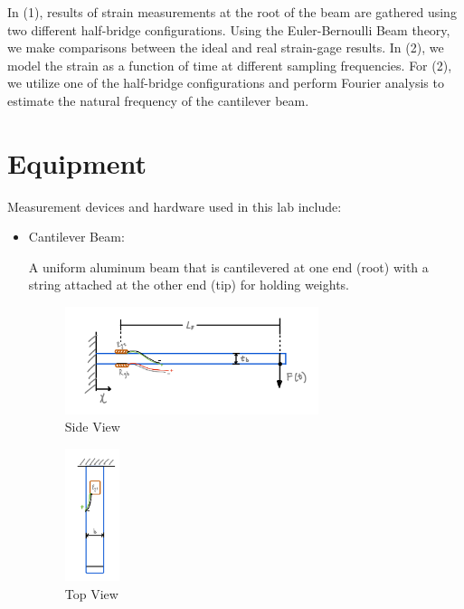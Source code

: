 \documentclass{article}
\begin{document}
In (1), results of strain measurements at the root of the beam are gathered using two different half-bridge configurations. Using the Euler-Bernoulli Beam theory, we make comparisons between the ideal and real strain-gage results. In (2), we model the strain as a function of time at different sampling frequencies. For (2), we utilize one of the half-bridge configurations and perform Fourier analysis to estimate the natural frequency of the cantilever beam. 

\section{Equipment}
Measurement devices and hardware used in this lab include:
\begin{itemize}

\item Cantilever Beam: 
\vspace{1mm}

A uniform aluminum beam that is cantilevered at one end (root) with a string attached at the other end (tip) for holding weights.
\vspace{2.5mm}

\begin{figure}[H]
    \centering
    \caption*{Side View}
    \includegraphics[width = 0.7\textwidth]{lab5images/cantilever_sideview.png}
\end{figure}
\begin{figure}[H]
    \centering
    \caption*{Top View}
    \includegraphics[width = 0.15\textwidth]{lab5images/cantilever_topview.png}
\end{figure}


\end{itemize}
\end{document}

